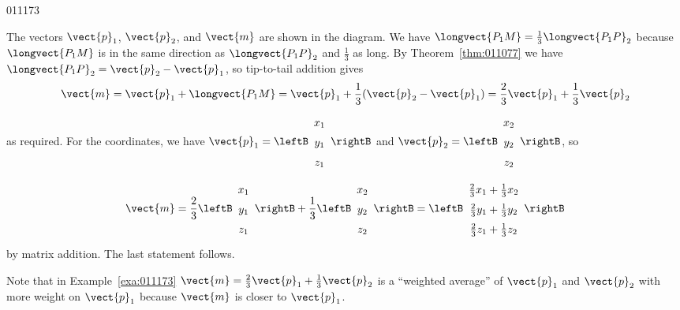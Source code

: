 \begin{example}{}{011173}
\setlength{\rightskip}{0pt plus 200pt} 
\begin{solution}
  The vectors $\vect{p}_{1}$, $\vect{p}_{2}$, and $\vect{m}$ are shown in the diagram. We have $\longvect{P_{1}M} = \frac{1}{3}\longvect{P_{1}P}_{2}$ because $\longvect{P_{1}M}$ is in the same direction as $\longvect{P_{1}P}_{2}$ and $\frac{1}{3}$ as long. By Theorem~\ref{thm:011077} we have $\longvect{P_{1}P}_{2} = \vect{p}_{2} - \vect{p}_{1}$, so tip-to-tail addition gives
\begin{equation*}
\vect{m} = \vect{p}_{1} + \longvect{P_{1}M} = \vect{p}_{1} + \frac{1}{3}(\vect{p}_{2} - \vect{p}_{1}) = \frac{2}{3}\vect{p}_{1} + \frac{1}{3}\vect{p}_{2} 
\end{equation*}
as required. For the coordinates, we have 
$\vect{p}_{1} = \leftB
\begin{array}{c}
x_{1} \\
y_{1} \\
z_{1}  
\end{array}
\rightB$ 
and 
$\vect{p}_{2} = \leftB
\begin{array}{c}
x_{2} \\
y_{2} \\
z_{2}  
\end{array}
\rightB$, so
\begin{equation*}
\vect{m} = \frac{2}{3}\leftB
\begin{array}{c}
x_{1} \\
y_{1} \\
z_{1}  
\end{array}
\rightB 
+
\frac{1}{3}\leftB
\begin{array}{c}
x_{2} \\
y_{2} \\
z_{2}  
\end{array}
\rightB
=
\leftB \def\arraystretch{1.5}
\begin{array}{c}
\frac{2}{3}x_{1} + \frac{1}{3}x_{2} \\ 
\frac{2}{3}y_{1} + \frac{1}{3}y_{2} \\
\frac{2}{3}z_{1} + \frac{1}{3}z_{2}  
\end{array}
\rightB
\end{equation*}
by matrix addition. The last statement follows.

\end{solution}
\end{example}

\noindent Note that in Example~\ref{exa:011173} $\vect{m} = \frac{2}{3}\vect{p}_{1} + \frac{1}{3}\vect{p}_{2}$ is a ``weighted average'' of $\vect{p}_{1}$ and $\vect{p}_{2}$ with more weight on $\vect{p}_{1}$ because $\vect{m}$ is closer to $\vect{p}_{1}$.


